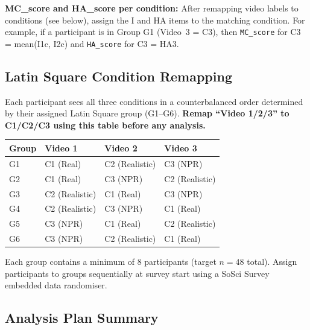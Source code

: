 \documentclass[11pt, a4paper]{article}
\begin{document}
\noindent\textbf{MC\_score and HA\_score per condition:} After remapping video labels to conditions (see below), assign the I and HA items to the matching condition. For example, if a participant is in Group G1 (Video~3 = C3), then \texttt{MC\_score} for C3 = mean(I1c, I2c) and \texttt{HA\_score} for C3 = HA3.

\subsection{Latin Square Condition Remapping}
\label{sec:latin_square}

Each participant sees all three conditions in a counterbalanced order determined by their assigned Latin Square group (G1--G6). \textbf{Remap ``Video 1/2/3'' to C1/C2/C3 using this table before any analysis.}

\begin{center}
\begin{tabular}{@{}llll@{}}
\toprule
\textbf{Group} & \textbf{Video 1} & \textbf{Video 2} & \textbf{Video 3} \\
\midrule
G1 & C1 (Real) & C2 (Realistic) & C3 (NPR) \\
G2 & C1 (Real) & C3 (NPR) & C2 (Realistic) \\
G3 & C2 (Realistic) & C1 (Real) & C3 (NPR) \\
G4 & C2 (Realistic) & C3 (NPR) & C1 (Real) \\
G5 & C3 (NPR) & C1 (Real) & C2 (Realistic) \\
G6 & C3 (NPR) & C2 (Realistic) & C1 (Real) \\
\bottomrule
\end{tabular}
\end{center}

\noindent\small Each group contains a minimum of 8 participants (target $n = 48$ total). Assign participants to groups sequentially at survey start using a SoSci Survey embedded data randomiser.

\subsection{Analysis Plan Summary}
\label{sec:analysis_plan}
\end{document}
